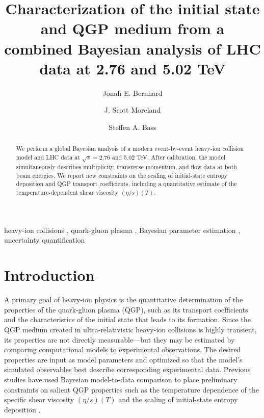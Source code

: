 \documentclass[3p,times,procedia,sort&compress]{elsarticle}
\begin{document}
\begin{frontmatter}


\title{Characterization of the initial state and QGP medium from a combined Bayesian analysis of LHC data at 2.76 and 5.02 TeV}

\author{Jonah E. Bernhard}
\author{J. Scott Moreland}
\author{Steffen A. Bass}

\address{Department of Physics, Duke University, Durham, NC 27708}

\begin{abstract}
  We perform a global Bayesian analysis of a modern event-by-event heavy-ion collision model and LHC data at $\sqrt s = 2.76$ and 5.02 TeV.
  After calibration, the model simultaneously describes multiplicity, transverse momentum, and flow data at both beam energies.
  We report new constraints on the scaling of initial-state entropy deposition and QGP transport coefficients, including a quantitative estimate of the temperature-dependent shear viscosity $(\eta/s)(T)$.
\end{abstract}

\begin{keyword}
  heavy-ion collisions \sep
  quark-gluon plasma \sep
  Bayesian parameter estimation \sep
  uncertainty quantification
\end{keyword}

\end{frontmatter}

\section{Introduction}

A primary goal of heavy-ion physics is the quantitative determination of the properties of the quark-gluon plasma (QGP), such as its transport coefficients and the characteristics of the initial state that leads to its formation.
Since the QGP medium created in ultra-relativistic heavy-ion collisions is highly transient, its properties are not directly measurable---but they may be estimated by comparing computational models to experimental observations.
The desired properties are input as model parameters and optimized so that the model's simulated observables best describe corresponding experimental data.
Previous studies have used Bayesian model-to-data comparison to place preliminary constraints on salient QGP properties such as the temperature dependence of the specific shear viscosity $(\eta/s)(T)$ and the scaling of initial-state entropy deposition \cite{Bernhard:2015hxa, Bernhard:2016tnd}.
\end{document}
